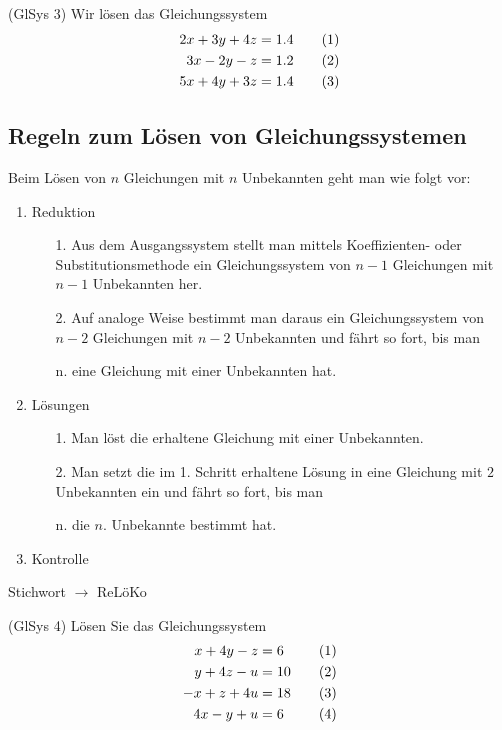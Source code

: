 \documentclass[%
11pt,%
twoside,%
titlepage,%
german,%
headsepline%
]{scrartcl}
\begin{document}
\begin{ueb}(GlSys 3)
  Wir l\"osen das Gleichungssystem
  \begin{align}
    2x+3y+4z&=1.4\qquad(1)\notag\\
    3x-2y-z&=1.2\qquad(2)\notag\\
    5x+4y+3z&=1.4\qquad(3)\notag
  \end{align}
\end{ueb}

\subsection{Regeln zum L\"osen von Gleichungssystemen}
Beim L\"osen von $n$ Gleichungen mit $n$ Unbekannten geht man wie
folgt vor:

\begin{enumerate}
  \item Reduktion
  \begin{enumerate}
    \item[1.] Aus dem Ausgangssystem stellt man mittels Koeffizienten-
    oder Substitutionsmethode ein Gleichungssystem von $n-1$
    Gleichungen mit $n-1$ Unbekannten her.
    \item[2.] Auf analoge Weise bestimmt man daraus ein Gleichungssystem
    von $n-2$ Gleichungen mit $n-2$ Unbekannten und f\"ahrt so fort,
    bis man
    \item[n.] eine Gleichung mit einer Unbekannten hat.
  \end{enumerate}
  \item L\"osungen
  \begin{enumerate}
    \item[1.] Man l\"ost die erhaltene Gleichung mit einer Unbekannten.
    \item[2.] Man setzt die im 1. Schritt erhaltene L\"osung in eine
    Gleichung mit $2$ Unbekannten ein und f\"ahrt so fort, bis man
    \item[n.] die $n$. Unbekannte bestimmt hat.
  \end{enumerate}
  \item Kontrolle
\end{enumerate}

\noindent Stichwort $\rightarrow$ ReL\"oKo

\begin{ueb}(GlSys 4)
  L\"osen Sie das Gleichungssystem
  \begin{align}
    x+4y-z&=6\phantom{1}\qquad(1)\notag\\
    y+4z-u&=10\qquad(2)\notag\\
    -x+z+4u&=18\qquad(3)\notag\\
    4x-y+u&=6\phantom{1}\qquad(4)\notag
  \end{align}
\end{ueb}
\end{document}
